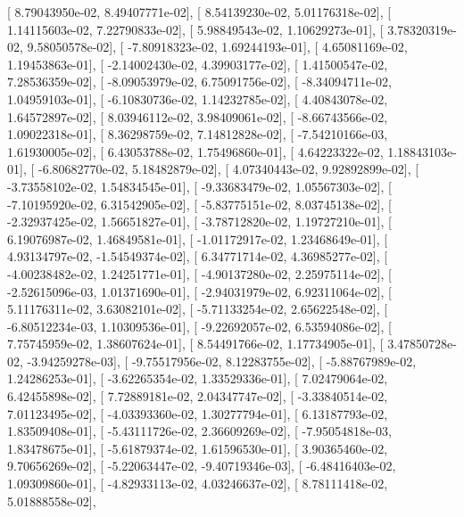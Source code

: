 \documentclass{article}
\begin{document}
       [  8.79043950e-02,   8.49407771e-02],
       [  8.54139230e-02,   5.01176318e-02],
       [  1.14115603e-02,   7.22790833e-02],
       [  5.98849543e-02,   1.10629273e-01],
       [  3.78320319e-02,   9.58050578e-02],
       [ -7.80918323e-02,   1.69244193e-01],
       [  4.65081169e-02,   1.19453863e-01],
       [ -2.14002430e-02,   4.39903177e-02],
       [  1.41500547e-02,   7.28536359e-02],
       [ -8.09053979e-02,   6.75091756e-02],
       [ -8.34094711e-02,   1.04959103e-01],
       [ -6.10830736e-02,   1.14232785e-02],
       [  4.40843078e-02,   1.64572897e-02],
       [  8.03946112e-02,   3.98409061e-02],
       [ -8.66743566e-02,   1.09022318e-01],
       [  8.36298759e-02,   7.14812828e-02],
       [ -7.54210166e-03,   1.61930005e-02],
       [  6.43053788e-02,   1.75496860e-01],
       [  4.64223322e-02,   1.18843103e-01],
       [ -6.80682770e-02,   5.18482879e-02],
       [  4.07340443e-02,   9.92892899e-02],
       [ -3.73558102e-02,   1.54834545e-01],
       [ -9.33683479e-02,   1.05567303e-02],
       [ -7.10195920e-02,   6.31542905e-02],
       [ -5.83775151e-02,   8.03745138e-02],
       [ -2.32937425e-02,   1.56651827e-01],
       [ -3.78712820e-02,   1.19727210e-01],
       [  6.19076987e-02,   1.46849581e-01],
       [ -1.01172917e-02,   1.23468649e-01],
       [  4.93134797e-02,  -1.54549374e-02],
       [  6.34771714e-02,   4.36985277e-02],
       [ -4.00238482e-02,   1.24251771e-01],
       [ -4.90137280e-02,   2.25975114e-02],
       [ -2.52615096e-03,   1.01371690e-01],
       [ -2.94031979e-02,   6.92311064e-02],
       [  5.11176311e-02,   3.63082101e-02],
       [ -5.71133254e-02,   2.65622548e-02],
       [ -6.80512234e-03,   1.10309536e-01],
       [ -9.22692057e-02,   6.53594086e-02],
       [  7.75745959e-02,   1.38607624e-01],
       [  8.54491766e-02,   1.17734905e-01],
       [  3.47850728e-02,  -3.94259278e-03],
       [ -9.75517956e-02,   8.12283755e-02],
       [ -5.88767989e-02,   1.24286253e-01],
       [ -3.62265354e-02,   1.33529336e-01],
       [  7.02479064e-02,   6.42455898e-02],
       [  7.72889181e-02,   2.04347747e-02],
       [ -3.33840514e-02,   7.01123495e-02],
       [ -4.03393360e-02,   1.30277794e-01],
       [  6.13187793e-02,   1.83509408e-01],
       [ -5.43111726e-02,   2.36609269e-02],
       [ -7.95054818e-03,   1.83478675e-01],
       [ -5.61879374e-02,   1.61596530e-01],
       [  3.90365460e-02,   9.70656269e-02],
       [ -5.22063447e-02,  -9.40719346e-03],
       [ -6.48416403e-02,   1.09309860e-01],
       [ -4.82933113e-02,   4.03246637e-02],
       [  8.78111418e-02,   5.01888558e-02],
\end{document}
